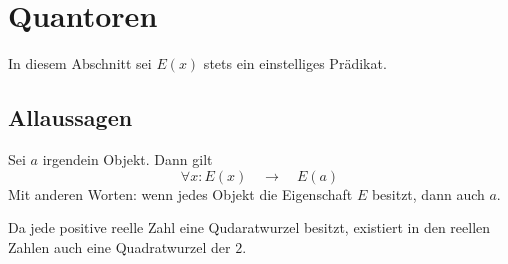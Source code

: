 \section{Quantoren}
In diesem Abschnitt sei $E(x)$ stets ein einstelliges Prädikat.


\subsection{Allaussagen}

\begin{axi} \label{allaxiom}
 Sei $a$ irgendein Objekt. Dann gilt
 \[ \forall x: E(x) \quad\to\quad E(a) \]
Mit anderen Worten: wenn jedes Objekt die Eigenschaft $E$ besitzt, dann auch $a$.
 \end{axi}


 
 \begin{bsp}
  Da jede positive reelle Zahl eine Qudaratwurzel besitzt, existiert in den reellen Zahlen auch eine Quadratwurzel der $2$.
 \end{bsp}

